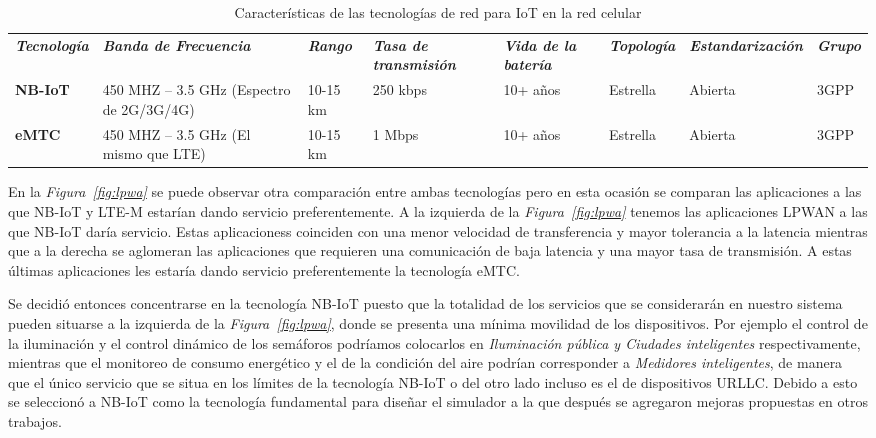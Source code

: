 \begin{table}
\caption{Características de las tecnologías de red para IoT en la red celular}
\label{tab:tecIoT}
\centering
\begin{tabular}{|p{0.9in}|p{0.6in}|p{0.4in}|p{0.6in}|p{0.4in}|p{0.8in}|p{1.3in}|p{0.4in}|} \\ \hline \hline
\textbf{\textit{Tecnología}} & \textbf{\textit{Banda de Frecuencia}} & \textbf{\textit{Rango}} & \textbf{\textit{Tasa de transmisión}} & \textbf{\textit{Vida de la batería}} & \textbf{\textit{Topología}} & \textbf{\textit{Estandarización}} & \textbf{\textit{Grupo}} \\ 
\textbf{NB-IoT}  & \footnotesize{ 450 MHZ -- 3.5 GHz (Espectro de 2G/3G/4G) } & \footnotesize{ 10-15 km } & \footnotesize{ 250 kbps } & \footnotesize{ 10+ años } & \footnotesize{ Estrella } & \footnotesize{ Abierta } & \footnotesize{ 3GPP } \\ \hline
\textbf{eMTC}  & \footnotesize{ 450 MHZ -- 3.5 GHz (El mismo que LTE) } & \footnotesize{ 10-15 km } & \footnotesize{ 1 Mbps } & \footnotesize{ 10+ años } & \footnotesize{ Estrella } & \footnotesize{ Abierta } & \footnotesize{ 3GPP } \\
\end{tabular}

\end{table}

En la \textit{Figura~\ref{fig:lpwa}} se puede observar otra comparación entre ambas tecnologías pero en esta ocasión se comparan las aplicaciones a las que  NB-IoT y LTE-M estarían dando servicio preferentemente. A la izquierda de la \textit{Figura~\ref{fig:lpwa}} tenemos las aplicaciones LPWAN a las que NB-IoT daría servicio. Estas aplicacioness coinciden con una menor velocidad de transferencia y mayor tolerancia a la latencia mientras que a la derecha se aglomeran las aplicaciones que requieren una comunicación de baja latencia y una mayor tasa de transmisión. A estas últimas aplicaciones les estaría dando servicio preferentemente la tecnología eMTC. \newline

Se decidió entonces concentrarse en la tecnología NB-IoT puesto que la totalidad de los servicios que se considerarán en nuestro sistema pueden situarse a la izquierda de la \textit{Figura~\ref{fig:lpwa}}, donde se presenta una mínima movilidad de los dispositivos. Por ejemplo el control de la iluminación y el control dinámico de los semáforos podríamos colocarlos en \textit{Iluminación pública y Ciudades inteligentes }respectivamente, mientras que el monitoreo de consumo energético y el de la condición del aire podrían corresponder a \textit{Medidores inteligentes}, de manera que el único servicio que se situa en los límites de la tecnología NB-IoT o del otro lado incluso es el de dispositivos URLLC. Debido a esto se seleccionó a NB-IoT como la tecnología fundamental para diseñar el simulador a la que después se agregaron mejoras propuestas en otros trabajos.  \newline


